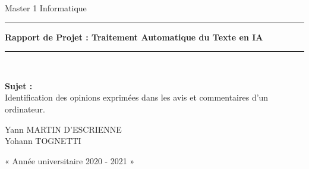 \documentclass[12pt ,a4paper ]{article}
\begin{document}
	\begin{titlepage}
		
		\vspace{0.5cm}
		\begin{center}		
			{\Large  Master 1 Informatique}
		\end{center}
		\vspace{1cm}
		
		\rule{1\linewidth}{1.1pt}\newline   %
		\begin{center}
			 {\Huge \textbf{Rapport de Projet : Traitement Automatique du Texte en IA}}
		\end{center}
		\rule{1\linewidth}{1.1pt} \\
		
		\begin{center}
		\begin{LARGE}
		\textbf{Sujet :} \\\vspace{0.6cm} Identification des opinions exprimées dans les avis et commentaires d’un ordinateur.
		\end{LARGE}
		\end{center}
		
		\vspace{0.5cm}
		\begin{center}	
				\begin{Large}
				Yann MARTIN D'ESCRIENNE \\ 
				Yohann TOGNETTI \\ 
				\end{Large}
		\end{center}
		\vspace{6cm}
		
		\begin{center}
			{\large « Année universitaire 2020 - 2021 »}
		\end{center}
		

\end{titlepage}

\newpage
\tableofcontents 
				
\newpage
\end{document}
